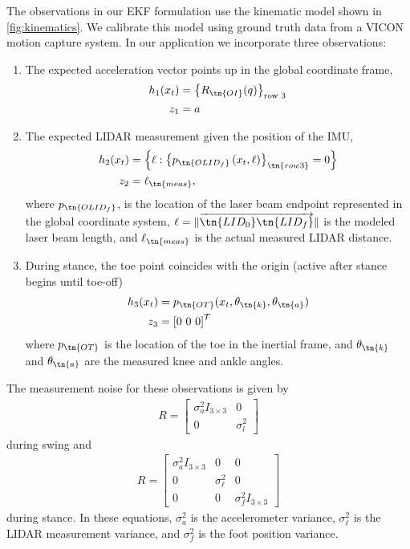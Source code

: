 The observations in our EKF formulation use the kinematic model shown in
\cref{fig:kinematics}. We calibrate this model using ground truth data from a
VICON motion capture system. In our application we incorporate three
observations:
\begin{enumerate}
\item The expected acceleration vector points up in the global coordinate frame,
\begin{align} 
    h_1(x_t) &= {\left\{R_\tn{OI}(q) \right\}}_\textrm{row 3} \\
    z_1 &= a
\end{align}

\item The expected LIDAR measurement given the position of the IMU,
\begin{align}
    h_2(x_t) &= \left\{\ell : \left\{ p_\tn{OLID_f}\left(x_t, \ell \right)
        \right\}_\tn{row 3} = 0\right\} \\
    z_2 &= \ell_\tn{meas},
\end{align}
where $p_\tn{OLID_f}$, is the location of the laser beam endpoint represented in
the global coordinate system, $\ell = \lVert
\overrightarrow{\tn{LID_0}\tn{LID_f}} \rVert$ is the modeled laser beam length,
and $\ell_\tn{meas}$ is the actual measured LIDAR distance.

\item During stance, the toe point coincides with the origin (active
 after stance begins until toe-off)
\begin{align}
    h_3(x_t) &= p_\tn{OT}(x_t, \theta_\tn{k}, \theta_\tn{a}) \\
    z_3 &= {[0 \ 0 \ 0]}^T
\end{align}
where $p_\tn{OT}$ is the location of the toe in the inertial frame, and
$\theta_\tn{k}$ and $\theta_\tn{a}$ are the measured knee and ankle angles.
\end{enumerate}

The measurement noise for these observations is given by
\begin{align}
    R = \begin{bmatrix} \sigma_a^2 I_{3\times3} & 0 \\
        0 & \sigma_l^2 \end{bmatrix}
\end{align}
during swing and
\begin{align}
    R = \begin{bmatrix} \sigma_a^2 I_{3\times3} & 0 & 0 \\
        0 & \sigma_\ell^2 & 0 \\
        0 & 0 & \sigma_f^2 I_{3\times3} \end{bmatrix}
\end{align}
during stance. In these equations, $\sigma_a^2$ is the accelerometer variance,
$\sigma_\ell^2$ is the LIDAR measurement variance, and $\sigma_f^2$ is the foot
position variance.

